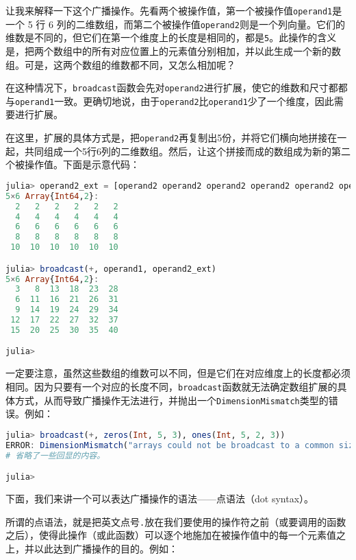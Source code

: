 让我来解释一下这个广播操作。先看两个被操作值，第一个被操作值\verb|operand1|是一个 5 行 6 列的二维数组，而第二个被操作值\verb|operand2|则是一个列向量。它们的维数是不同的，但它们在第一个维度上的长度是相同的，都是\verb|5|。此操作的含义是，把两个数组中的所有对应位置上的元素值分别相加，并以此生成一个新的数组。可是，这两个数组的维数都不同，又怎么相加呢？

在这种情况下，\verb|broadcast|函数会先对\verb|operand2|进行扩展，使它的维数和尺寸都都与\verb|operand1|一致。更确切地说，由于\verb|operand2|比\verb|operand1|少了一个维度，因此需要进行扩展。

在这里，扩展的具体方式是，把\verb|operand2|再复制出5份，并将它们横向地拼接在一起，共同组成一个5行6列的二维数组。然后，让这个拼接而成的数组成为新的第二个被操作值。下面是示意代码：

\begin{lstlisting}[language=julia]
julia> operand2_ext = [operand2 operand2 operand2 operand2 operand2 operand2]
5×6 Array{Int64,2}:
  2   2   2   2   2   2
  4   4   4   4   4   4
  6   6   6   6   6   6
  8   8   8   8   8   8
 10  10  10  10  10  10

julia> broadcast(+, operand1, operand2_ext)
5×6 Array{Int64,2}:
  3   8  13  18  23  28
  6  11  16  21  26  31
  9  14  19  24  29  34
 12  17  22  27  32  37
 15  20  25  30  35  40

julia> 
\end{lstlisting}

一定要注意，虽然这些数组的维数可以不同，但是它们在对应维度上的长度都必须相同。因为只要有一个对应的长度不同，\verb|broadcast|函数就无法确定数组扩展的具体方式，从而导致广播操作无法进行，并抛出一个\verb|DimensionMismatch|类型的错误。例如：

\begin{lstlisting}[language=julia]
julia> broadcast(+, zeros(Int, 5, 3), ones(Int, 5, 2, 3))
ERROR: DimensionMismatch("arrays could not be broadcast to a common size")
# 省略了一些回显的内容。

julia> 
\end{lstlisting}

下面，我们来讲一个可以表达广播操作的语法——点语法（dot syntax）。

所谓的点语法，就是把英文点号\verb|.|放在我们要使用的操作符之前（或要调用的函数之后），使得此操作（或此函数）可以逐个地施加在被操作值中的每一个元素值之上，并以此达到广播操作的目的。例如：

